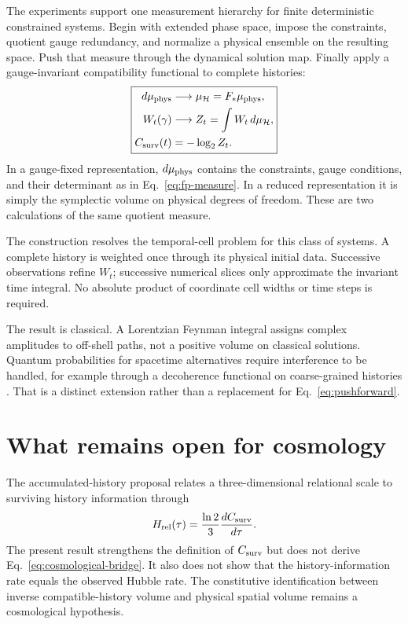 \documentclass[10pt]{article}
\begin{document}
The experiments support one measurement hierarchy for finite deterministic
constrained systems.  Begin with extended phase space, impose the constraints,
quotient gauge redundancy, and normalize a physical ensemble on the resulting
space.  Push that measure through the dynamical solution map.  Finally apply a
gauge-invariant compatibility functional to complete histories:
\begin{equation}
\boxed{
\begin{aligned}
d\mu_{\rm phys}
&\longrightarrow
\mu_{\mathcal H}=F_*\mu_{\rm phys},\\
W_t(\gamma)
&\longrightarrow
Z_t=\int W_t\,d\mu_{\mathcal H},\\
C_{\rm surv}(t)
&=-\log_2 Z_t.
\end{aligned}}
\label{eq:classical-history-object}
\end{equation}
In a gauge-fixed representation, $d\mu_{\rm phys}$ contains the constraints,
gauge conditions, and their determinant as in Eq.~\eqref{eq:fp-measure}.  In a
reduced representation it is simply the symplectic volume on physical degrees
of freedom.  These are two calculations of the same quotient measure.

The construction resolves the temporal-cell problem for this class of
systems.  A complete history is weighted once through its physical initial
data.  Successive observations refine $W_t$; successive numerical slices only
approximate the invariant time integral.  No absolute product of coordinate
cell widths or time steps is required.

The result is classical.  A Lorentzian Feynman integral assigns complex
amplitudes to off-shell paths, not a positive volume on classical solutions.
Quantum probabilities for spacetime alternatives require interference to be
handled, for example through a decoherence functional on coarse-grained
histories \citep{Hartle1993}.  That is a distinct extension rather than a
replacement for Eq.~\eqref{eq:pushforward}.

\section*{What remains open for cosmology}

The accumulated-history proposal relates a three-dimensional relational scale
to surviving history information through
\begin{equation}
H_{\rm rel}(\tau)
=\frac{\ln2}{3}\frac{dC_{\rm surv}}{d\tau}.
\label{eq:cosmological-bridge}
\end{equation}
The present result strengthens the definition of $C_{\rm surv}$ but does not
derive Eq.~\eqref{eq:cosmological-bridge}.  It also does not show that the
history-information rate equals the observed Hubble rate.  The constitutive
identification between inverse compatible-history volume and physical spatial
volume remains a cosmological hypothesis.
\end{document}
